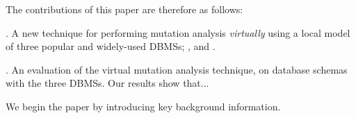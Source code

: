 The contributions of this paper are therefore as follows:

. A new technique for performing mutation analysis {\it virtually} using a local model of three popular and widely-used DBMSs; \HyperSQL, \Postgres and \SQLite.

\vspace{1mm} . An evaluation of the virtual mutation analysis technique, on \numschemas database schemas with the three DBMSs. Our results show that...

We begin the paper by introducing key background information.





